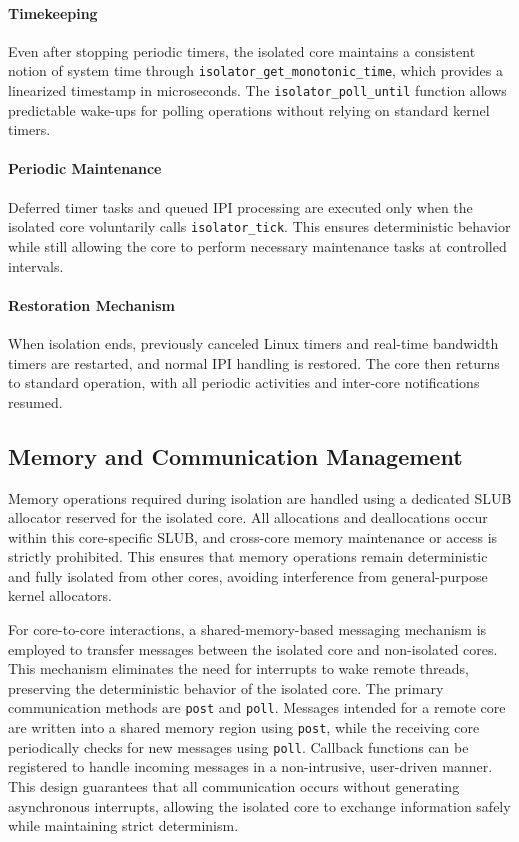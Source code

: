 \documentclass[letterpaper]{article}
\begin{document}
\paragraph{Timekeeping}  
Even after stopping periodic timers, the isolated core maintains a consistent notion of system time through \texttt{isolator\_get\_monotonic\_time}, which provides a linearized timestamp in microseconds. The \texttt{isolator\_poll\_until} function allows predictable wake-ups for polling operations without relying on standard kernel timers.

\paragraph{Periodic Maintenance}  
Deferred timer tasks and queued IPI processing are executed only when the isolated core voluntarily calls \texttt{isolator\_tick}. This ensures deterministic behavior while still allowing the core to perform necessary maintenance tasks at controlled intervals.

\paragraph{Restoration Mechanism}  
When isolation ends, previously canceled Linux timers and real-time bandwidth timers are restarted, and normal IPI handling is restored. The core then returns to standard operation, with all periodic activities and inter-core notifications resumed.


\subsection{Memory and Communication Management}
\label{subsec:memory-communication}

Memory operations required during isolation are handled using a dedicated SLUB allocator reserved for the isolated core. All allocations and deallocations occur within this core-specific SLUB, and cross-core memory maintenance or access is strictly prohibited. This ensures that memory operations remain deterministic and fully isolated from other cores, avoiding interference from general-purpose kernel allocators.

For core-to-core interactions, a shared-memory-based messaging mechanism is employed to transfer messages between the isolated core and non-isolated cores. This mechanism eliminates the need for interrupts to wake remote threads, preserving the deterministic behavior of the isolated core. The primary communication methods are \texttt{post} and \texttt{poll}. Messages intended for a remote core are written into a shared memory region using \texttt{post}, while the receiving core periodically checks for new messages using \texttt{poll}. Callback functions can be registered to handle incoming messages in a non-intrusive, user-driven manner. This design guarantees that all communication occurs without generating asynchronous interrupts, allowing the isolated core to exchange information safely while maintaining strict determinism.
\end{document}
